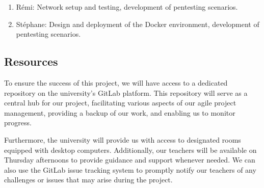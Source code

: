 \documentclass[a4paper,11pt,singlespacing]{article}
\begin{document}
\begin{enumerate}
    \item Rémi: Network setup and testing, development of pentesting scenarios.
    \item Stéphane: Design and deployment of the Docker environment, development of pentesting scenarios.
\end{enumerate}

\subsection{Resources}
To ensure the success of this project, we will have access to a dedicated repository on the university's GitLab platform. This repository will serve as a central hub for our project, facilitating various aspects of our agile project management, providing a backup of our work, and enabling us to monitor progress.\par
Furthermore, the university will provide us with access to designated rooms equipped with desktop computers. Additionally, our teachers will be available on Thursday afternoons to provide guidance and support whenever needed. We can also use the GitLab issue tracking system to promptly notify our teachers of any challenges or issues that may arise during the project.\par
\end{document}
